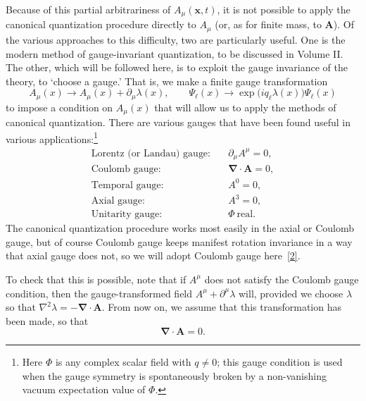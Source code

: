 Because of this partial arbitrariness of $A_\mu(\mathbf x,t)$, it is not possible
to apply the canonical quantization procedure directly to $A_\mu$ (or, as for
finite mass, to $\mathbf A$). Of the various approaches to this difficulty, two
are particularly useful. One is the modern method of gauge-invariant
quantization, to be discussed in Volume II. The other, which will be followed
here, is to exploit the gauge invariance of the theory, to `choose a gauge.'
That is, we make a finite gauge transformation
\[
  A_\mu(x)\longrightarrow A_\mu(x)+\partial_\mu\lambda(x),
  \qquad
  \Psi_\ell(x)\longrightarrow\exp\!\bigl(iq_\ell\lambda(x)\bigr)\Psi_\ell(x)
\]
to impose a condition on $A_\mu(x)$ that will allow us to apply the methods
of canonical quantization. There are various gauges that have been found
useful in various applications:\footnote{Here $\Phi$ is any complex scalar
field with $q\ne0$; this gauge condition is used when the gauge symmetry is
spontaneously broken by a non-vanishing vacuum expectation value of $\Phi$.}
\begin{align*}
  \text{Lorentz (or Landau) gauge:}\quad&\partial_\mu A^\mu=0,\\
  \text{Coulomb gauge:}\quad&\boldsymbol\nabla\cdot\mathbf A=0,\\
  \text{Temporal gauge:}\quad&A^0=0,\\
  \text{Axial gauge:}\quad&A^3=0,\\
  \text{Unitarity gauge:}\quad&\Phi\ \text{real}.
\end{align*}
The canonical quantization procedure works most easily in the axial or
Coulomb gauge, but of course Coulomb gauge keeps manifest rotation
invariance in a way that axial gauge does not, so we will adopt Coulomb
gauge here~\hyperref[ref:8.2]{[2]}.

To check that this is possible, note that if $A^\mu$ does not satisfy the
Coulomb gauge condition, then the gauge-transformed field
$A^\mu+\partial^\mu\lambda$ will, provided we choose $\lambda$ so that
$\nabla^2\lambda=-\boldsymbol\nabla\cdot\mathbf A$. From now on, we assume
that this transformation has been made, so that
\begin{equation}
  \boldsymbol\nabla\cdot\mathbf A=0.
  \tag{8.2.6}\label{eq:8.2.6}
\end{equation}

